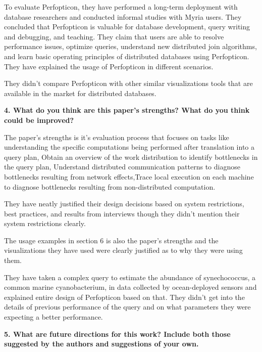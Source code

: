 \documentclass{article}[12pt]
\begin{document}
{
   To evaluate Perfopticon, they have performed a long-term deployment with database researchers and conducted informal studies with Myria users. They concluded that Perfopticon is valuable for database development, query writing and debugging, and teaching. They claim that users are able to resolve performance issues, optimize queries, understand new distributed join algorithms, and learn basic operating principles of distributed databases using Perfopticon. They have explained the usage of Perfopticon in different scenarios. 
   
   They didn't compare Perfopticon with other similar visualizations tools that are available in the market for distributed databases. 
}




\vspace{2ex}\noindent
{ \bf 4. What do you think are this paper's strengths? What do you think could be improved? }

{
    The paper's strengths is it's evaluation process that focuses on tasks like understanding the specific computations being performed after translation into a query plan, Obtain an overview of the work distribution to identify bottlenecks in the query plan, Understand distributed communication patterns to diagnose bottlenecks resulting from network effects,Trace local execution on each machine to diagnose bottlenecks resulting from non-distributed computation. 
    
    They have neatly justified their design decisions based on system restrictions, best practices, and results from interviews though they didn't mention their system restrictions clearly.
    
    The usage examples in section 6 is also the paper's strengths and the visualizations they have used were clearly justified as to why they were using them.
    
    They have taken a complex query to estimate the abundance of synechococcus, a common marine cyanobacterium, in data collected by ocean-deployed sensors and explained entire design of Perfopticon based on that. They didn't get into the details of previous performance of the query and on what parameters they were expecting a better performance. 
    
}


\vspace{2ex}\noindent
{\bf 5. What are future directions for this work? Include both those suggested by the authors and suggestions of your own.}
\end{document}
